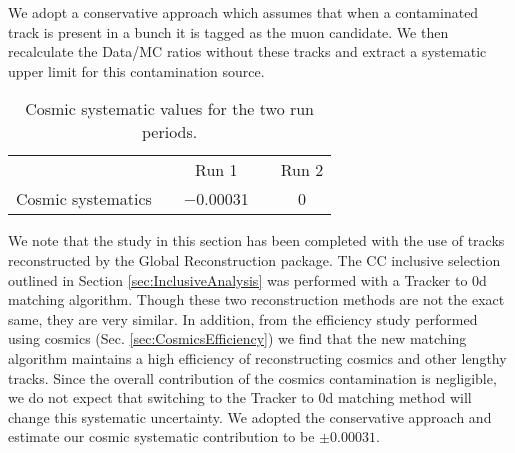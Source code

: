 We adopt a conservative approach which assumes that when 
a contaminated track is
present in a bunch it is tagged as the muon candidate. 
We then recalculate the Data/MC ratios without these tracks and extract 
a systematic upper limit for this contamination source.

\begin{table}[h]
\centering
\begin{tabular}{ccccc}
\toprule
   & & Run 1& & Run 2\\
\cline{3-3}\cline{5-5} 
Cosmic systematics & & $-$0.00031 & & 0 \\
\bottomrule
\end{tabular} 
\caption{Cosmic systematic values for the two run periods.}
\label{tab:CosmicSystematics}
\end{table}

We note that the study in this section has been completed with the use 
of tracks reconstructed by the Global Reconstruction package. 
The CC inclusive selection outlined in Section \ref{sec:InclusiveAnalysis} 
was performed with a Tracker to \p0d matching algorithm. 
Though these two reconstruction methods are not the exact same, 
they are very similar. In addition, from the efficiency study performed 
using cosmics (Sec. \ref{sec:CosmicsEfficiency})  
we find that the new matching algorithm maintains a high efficiency 
of reconstructing cosmics and other lengthy tracks. 
Since the overall contribution of the cosmics contamination is negligible, 
we do not expect that switching to the Tracker to \p0d matching method 
will change this systematic uncertainty. 
We adopted the conservative approach and estimate our cosmic 
systematic contribution to be $\pm0.00031$.


